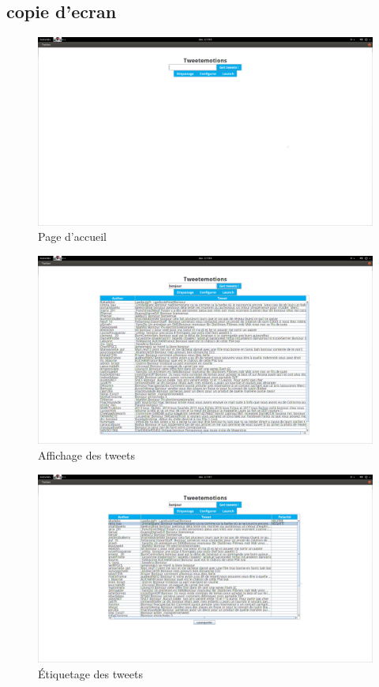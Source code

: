 \documentclass[a4paper,10pt]{report}
\begin{document}
    \subsection{copie d'ecran}
      \begin{figure}[!h]
	\centering
	\includegraphics[scale=0.2]{impressions-ecran/accueil.png}
	\caption{Page d'accueil}
	\label{accueil}
      \end{figure}
      \begin{figure}[!h]
	\centering
	\includegraphics[scale=0.2]{impressions-ecran/tweets.png}
	\caption{Affichage des tweets}
	\label{tweets}
      \end{figure}
      \begin{figure}[!h]
	\centering
	\includegraphics[scale=0.2]{impressions-ecran/etiquetage.png}
	\caption{Étiquetage des tweets}
	\label{etiquetage}
      \end{figure}
\end{document}
